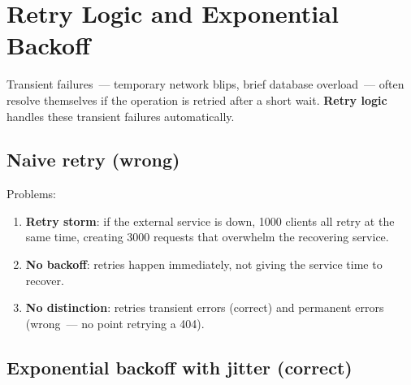 \setcounter{section}{5}
\section{Retry Logic and Exponential Backoff}\label{37-reliability:376-retry-logic-and-exponential-backoff}

Transient failures~--- temporary network blips, brief database overload~--- often resolve themselves if the operation is retried after a short wait. \textbf{Retry logic} handles these transient failures automatically.

\subsection*{Naive retry (wrong)}\label{37-reliability:naive-retry-wrong}

\begin{codebox}[short]

\begin{Shaded}
\begin{Highlighting}[]
 \NormalTok{(}\NormalTok{):}
    \NormalTok{:}
\OperatorTok{=}
     \NormalTok{:}
\end{Highlighting}
\end{Shaded}

\end{codebox}

\noindent{}Problems:

\begin{enumerate}
\def\labelenumi{\arabic{enumi}.}
\tightlist
\item
  \textbf{Retry storm}: if the external service is down, 1000 clients all retry at the same time, creating 3000 requests that overwhelm the recovering service.
\item
  \textbf{No backoff}: retries happen immediately, not giving the service time to recover.
\item
  \textbf{No distinction}: retries transient errors (correct) and permanent errors (wrong~--- no point retrying a 404).
\end{enumerate}

\subsection*{Exponential backoff with jitter (correct)}\label{37-reliability:exponential-backoff-with-jitter-correct}

